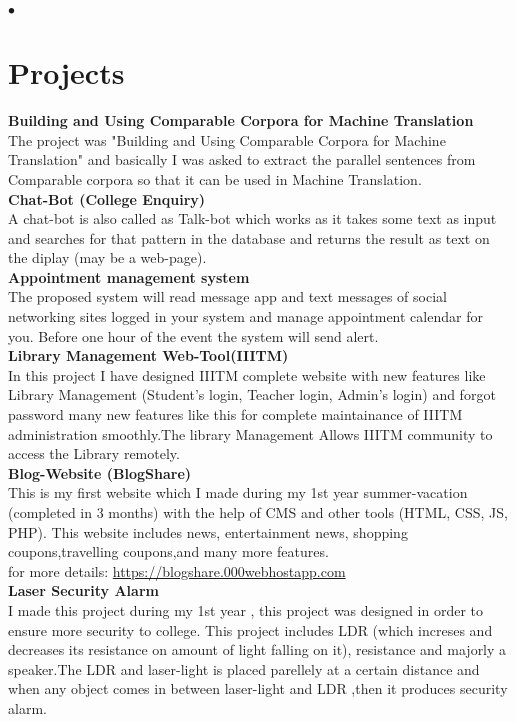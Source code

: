 \documentclass[margin,line]{res}
\newenvironment{list2}{
  \begin{list}{$\bullet$}{%
      \setlength{\itemsep}{0in}
      \setlength{\parsep}{0in} \setlength{\parskip}{0in}
      \setlength{\topsep}{0in} \setlength{\partopsep}{0in}
      \setlength{\leftmargin}{0.2in}}}{\end{list}}
\begin{document}
\begin{resume}
\begin{list2}
\end{list2}


\section{\sc Projects}

{\bf Building and Using Comparable Corpora for Machine Translation}\\
The project was "Building and Using Comparable Corpora for Machine Translation" and basically I was asked to extract the parallel sentences from Comparable corpora so that it can be used in Machine Translation.\\

{\bf Chat-Bot (College Enquiry)}\\
A chat-bot is also called as Talk-bot which works as it takes some text as input and searches for that pattern in the database and returns the result as text on the diplay (may be a web-page). \\

{\bf Appointment management system }\\
The proposed system will read message app and text messages of social networking sites logged in your system and manage appointment calendar for you. Before one hour of the event the system will send alert.\\

{\bf Library Management Web-Tool(IIITM)}\\
In this project I have designed IIITM complete website with new features like Library Management (Student's login, Teacher login, Admin's login) and forgot password many new features like this for complete maintainance of IIITM administration smoothly.The library Management Allows IIITM community to access the Library remotely.
\\

{\bf Blog-Website (BlogShare) }\\
This is my first website which I made during my 1st year summer-vacation (completed in 3 months) with the help of CMS and other tools (HTML, CSS, JS, PHP). This website includes news, entertainment news, shopping coupons,travelling coupons,and many more features.
\\for more details: \url{https://blogshare.000webhostapp.com} 
\\

{\bf Laser Security Alarm }\\
I made this project during my 1st year , this project was designed in order to ensure more security to college. This project includes LDR (which increses and decreases its resistance on amount of light falling on it), resistance and majorly a speaker.The LDR and laser-light is placed parellely at a certain distance and when any object comes in between laser-light and LDR ,then it produces security alarm.
\\


\end{resume}
\end{document}
